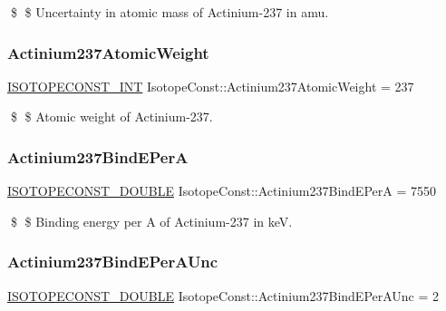 \$ \$ Uncertainty in atomic mass of Actinium-\/237 in amu. \mbox{\label{group___isotope_const-_actinium-_ac237_ga71b80083718b27a493a9bfe84da0d33b}} 
\subsubsection{\texorpdfstring{Actinium237\+Atomic\+Weight}{Actinium237AtomicWeight}}
{\footnotesize\ttfamily \mbox{\hyperlink{group___isotope_const-_macros_ga5f18360b3e99483a35c32d789e62621c}{I\+S\+O\+T\+O\+P\+E\+C\+O\+N\+S\+T\+\_\+\+I\+NT}} Isotope\+Const\+::\+Actinium237\+Atomic\+Weight = 237}

\$ \$ Atomic weight of Actinium-\/237. \mbox{\label{group___isotope_const-_actinium-_ac237_gae43f74f428eb678b223bb2fdccda66bb}} 
\subsubsection{\texorpdfstring{Actinium237\+Bind\+E\+PerA}{Actinium237BindEPerA}}
{\footnotesize\ttfamily \mbox{\hyperlink{group___isotope_const-_macros_ga8f45a7272ce02c0b4c65c44636ed719a}{I\+S\+O\+T\+O\+P\+E\+C\+O\+N\+S\+T\+\_\+\+D\+O\+U\+B\+LE}} Isotope\+Const\+::\+Actinium237\+Bind\+E\+PerA = 7550}

\$ \$ Binding energy per A of Actinium-\/237 in keV. \mbox{\label{group___isotope_const-_actinium-_ac237_ga6e4e9c058d54e1d65fb3e623eb70caab}} 
\subsubsection{\texorpdfstring{Actinium237\+Bind\+E\+Per\+A\+Unc}{Actinium237BindEPerAUnc}}
{\footnotesize\ttfamily \mbox{\hyperlink{group___isotope_const-_macros_ga8f45a7272ce02c0b4c65c44636ed719a}{I\+S\+O\+T\+O\+P\+E\+C\+O\+N\+S\+T\+\_\+\+D\+O\+U\+B\+LE}} Isotope\+Const\+::\+Actinium237\+Bind\+E\+Per\+A\+Unc = 2}

